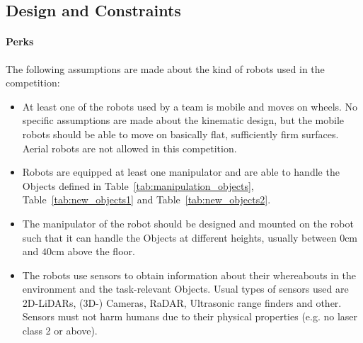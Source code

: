 \subsection{Design and Constraints} \label{ssec:RobotDesignAndConstraints}

\paragraph{Perks}
The following assumptions are made about the kind of robots used in the competition:

\begin{itemize}
	\item At least one of the robots used by a team is mobile and moves on wheels. No specific assumptions are made about the kinematic design, but the mobile robots should be able to move on basically flat, sufficiently firm surfaces. Aerial robots are not allowed in this competition. 
	\item Robots are equipped at least one manipulator and are able to handle the Objects defined in Table~\ref{tab:manipulation_objects}, Table~\ref{tab:new_objects1} and Table~\ref{tab:new_objects2}.
	\item The manipulator of the robot should be designed and mounted on the robot such that it can handle the Objects at different heights, usually between $0\si{\centi\meter}$ and $40\si{\centi\meter}$ above the floor.
	\item The robots use sensors to obtain information about their whereabouts in the environment and the task-relevant Objects. 
	Usual types of sensors used are 2D-LiDARs, (3D-) Cameras, RaDAR, Ultrasonic range finders and other. 
	Sensors must not harm humans due to their physical properties (e.g. no laser class 2 or above).

\end{itemize}

